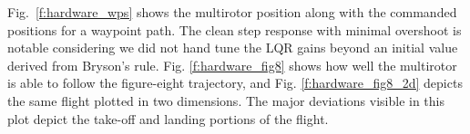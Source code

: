 Fig.~\ref{f:hardware_wps} shows the multirotor position along with the commanded
positions for a waypoint path. The clean step response with minimal overshoot is
notable considering we did not hand tune the LQR gains beyond an initial value
derived from Bryson's rule. Fig. \ref{f:hardware_fig8} shows how well the
multirotor is able to follow the figure-eight trajectory, and Fig.
\ref{f:hardware_fig8_2d} depicts the same flight plotted in two dimensions. The
major deviations visible in this plot depict the take-off and landing portions
of the flight.
